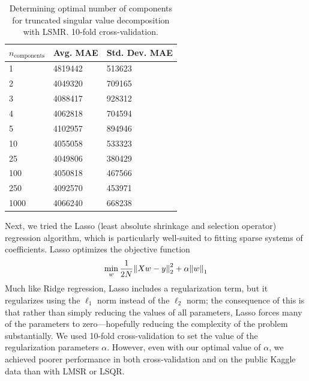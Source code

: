 \documentclass[11pt]{amsart}
\begin{document}
\begin{table}[h]
\begin{tabular}{@{}lll@{}}
\toprule
$n_\text{components}$ & Avg. MAE & Std. Dev. MAE \\ \midrule
1             & 4819442  & 513623        \\
2             & 4049320  & 709165        \\
3             & 4088417  & 928312        \\
4             & 4062818  & 704594        \\
5             & 4102957  & 894946        \\
10            & 4055058  & 533323        \\
25            & 4049806  & 380429        \\
100           & 4050818  & 467566        \\
250           & 4092570  & 453971        \\
1000          & 4066240  & 668238        \\ \bottomrule
\end{tabular}
\caption{Determining optimal number of components for truncated singular value decomposition with LSMR. 10-fold cross-validation.}
\end{table}

Next, we tried the Lasso (least absolute shrinkage and selection operator) regression algorithm, which is particularly well-suited to fitting sparse systems of coefficients. Lasso optimizes the objective function
$$\min_w \frac{1}{2 N} \norm{X w - y}_2^2 + \alpha \norm{w}_1$$
Much like Ridge regression, Lasso includes a regularization term, but it regularizes using the $\ell_1$ norm instead of the $\ell_2$ norm; the consequence of this is that rather than simply reducing the values of all parameters, Lasso forces many of the parameters to zero---hopefully reducing the complexity of the problem substantially. We used 10-fold cross-validation to set the value of the regularization parameters $\alpha$. However, even with our optimal value of $\alpha$, we achieved poorer performance in both cross-validation and on the public Kaggle data than with LMSR or LSQR. 
\end{document}
